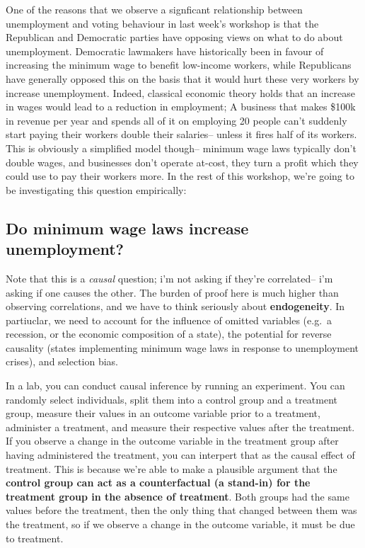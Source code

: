 \documentclass[
  letterpaper,
  DIV=11,
  numbers=noendperiod]{scrreprt}
\begin{document}
One of the reasons that we observe a signficant relationship between
unemployment and voting behaviour in last week's workshop is that the
Republican and Democratic parties have opposing views on what to do
about unemployment. Democratic lawmakers have historically been in
favour of increasing the minimum wage to benefit low-income workers,
while Republicans have generally opposed this on the basis that it would
hurt these very workers by increase unemployment. Indeed, classical
economic theory holds that an increase in wages would lead to a
reduction in employment; A business that makes \$100k in revenue per
year and spends all of it on employing 20 people can't suddenly start
paying their workers double their salaries-- unless it fires half of its
workers. This is obviously a simplified model though-- minimum wage laws
typically don't double wages, and businesses don't operate at-cost, they
turn a profit which they could use to pay their workers more. In the
rest of this workshop, we're going to be investigating this question
empirically:

\hypertarget{do-minimum-wage-laws-increase-unemployment}{%
\subsection{Do minimum wage laws increase
unemployment?}\label{do-minimum-wage-laws-increase-unemployment}}

Note that this is a \emph{causal} question; i'm not asking if they're
correlated-- i'm asking if one causes the other. The burden of proof
here is much higher than observing correlations, and we have to think
seriously about \textbf{endogeneity}. In partiuclar, we need to account
for the influence of omitted variables (e.g.~a recession, or the
economic composition of a state), the potential for reverse causality
(states implementing minimum wage laws in response to unemployment
crises), and selection bias.

In a lab, you can conduct causal inference by running an experiment. You
can randomly select individuals, split them into a control group and a
treatment group, measure their values in an outcome variable prior to a
treatment, administer a treatment, and measure their respective values
after the treatment. If you observe a change in the outcome variable in
the treatment group after having administered the treatment, you can
interpert that as the causal effect of treatment. This is because we're
able to make a plausible argument that the \textbf{control group can act
as a counterfactual (a stand-in) for the treatment group in the absence
of treatment}. Both groups had the same values before the treatment,
then the only thing that changed between them was the treatment, so if
we observe a change in the outcome variable, it must be due to
treatment.
\end{document}
